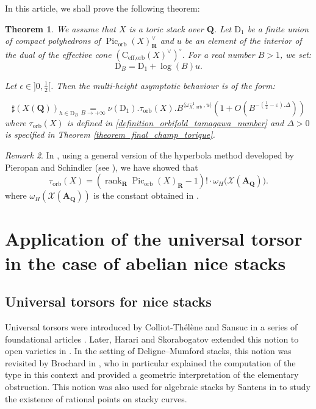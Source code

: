 \documentclass{proc-l}
\newcommand{\R}{\mathbf{R}}
\newcommand{\Q}{\mathbf{Q}}
\newcommand{\coneorb}{\text{C}_{\text{eff},\text{orb}}(X)}
\DeclareMathOperator{\Pic}{Pic}
\DeclareMathOperator{\rank}{rank}
\DeclareMathOperator{\orb}{orb}
\newcommand{\stackX}{\mathcal{X}}
\newcommand{\affine}{\mathbf{A}}
\newcommand{\w}{\omega}
\newtheorem{theorem}{Theorem}[section]
\theoremstyle{definition}
\theoremstyle{remark}
\newtheorem{remark}[theorem]{Remark}
\numberwithin{equation}{section}
\begin{document}
In this article, we shall prove the following theorem:

\begin{theorem}\label{theorem_manin_peyre_conjecture}
We assume that $X$ is a toric stack over $\Q$. Let $\mathrm{D}_1$ be a finite union of compact polyhedrons of $\Pic_{\orb}(X)^{\vee}_{\R}$ and $u$ be an element of the interior of the dual of the effective cone $(\coneorb^{\vee})^{\circ}$. For a real number $B > 1$, we set:
$$ \mathrm{D}_B = \mathrm{D}_1 + \log(B) u .$$
 
Let $\epsilon \in ]0,\frac{1}{2}[$. Then the multi-height asymptotic behaviour is of the form:

$$ \sharp ( X(\Q) )_{h \in \mathrm{D}_B} \underset{B \rightarrow +\infty}{=} \nu(\mathrm{D}_1 ) . \tau_{\orb}(X) .  B^{\langle \w_{X,\orb}^{-1},u \rangle} \left( 1 + O\left(B^{- ( \frac{1}{2} - \varepsilon).\Delta} \right) \right)$$ where $\tau_{\orb}(X)$ is defined in \ref{definition_orbifold_tamagawa_number} and $\Delta > 0$ is specified in Theorem \ref{theorem_final_champ_torique}.

\end{theorem}

\begin{remark}
    In \cite{bongiorno_hyperbola_method}, using a general version of the hyperbola method developed by Pieropan and Schindler (see \cite{pieropan_hyperbola_method}), we have showed that \[
    \tau_{\orb}(X) 
    = \left(\rank_{\R}\Pic_{\orb}(X)_{\R} - 1\right)! \cdot
    \w_H\bigl(\stackX(\affine_{\Q})\bigr).
\] where $\w_H(\stackX(\affine_{\Q}))$ is the constant obtained in \cite[theorem 4.4.4]{darda_yasuda_toric_stacks_batyrev}.
\end{remark}








\section{Application of the universal torsor in the case of abelian nice stacks}

\subsection{Universal torsors for nice stacks}\label{subsection_universal_torsor}




Universal torsors were introduced by Colliot-Thélène and Sansuc in a series of foundational articles \cite{ColliotTheleneSansuc1976,ColliotTheleneSansuc1979,ColliotTheleneSansuc1987}. Later, Harari and Skorabogatov extended this notion to open varieties in \cite{HarariSkorobogatov2013}. In the setting of Deligne--Mumford stacks, this notion was revisited by Brochard in \cite{Brochard2021}, who in particular explained the computation of the type in this context and provided a geometric interpretation of the elementary obstruction. This notion was also used for algebraic stacks by Santens in \cite{santens2023brauermaninobstructionstackycurves} to study the existence of rational points on stacky curves.
\end{document}
